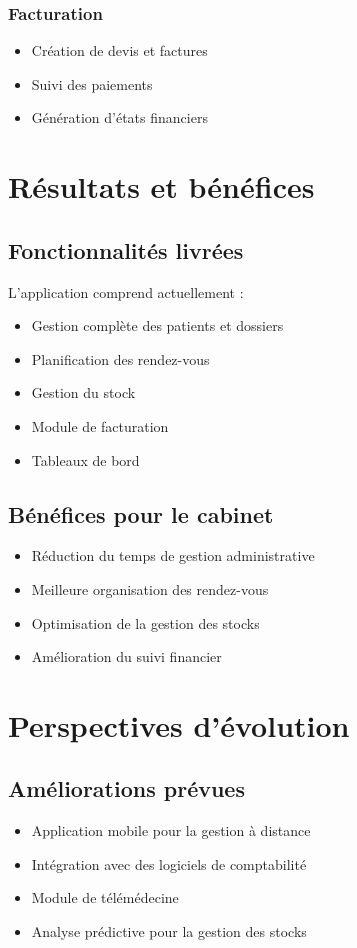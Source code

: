\documentclass[12pt,a4paper]{report}
\begin{document}
\subsection{Facturation}
\begin{itemize}
    \item Création de devis et factures
    \item Suivi des paiements
    \item Génération d'états financiers
\end{itemize}

\chapter{Résultats et bénéfices}
\section{Fonctionnalités livrées}
L'application comprend actuellement :
\begin{itemize}
    \item Gestion complète des patients et dossiers
    \item Planification des rendez-vous
    \item Gestion du stock
    \item Module de facturation
    \item Tableaux de bord
\end{itemize}

\section{Bénéfices pour le cabinet}
\begin{itemize}
    \item Réduction du temps de gestion administrative
    \item Meilleure organisation des rendez-vous
    \item Optimisation de la gestion des stocks
    \item Amélioration du suivi financier
\end{itemize}

\chapter{Perspectives d'évolution}
\section{Améliorations prévues}
\begin{itemize}
    \item Application mobile pour la gestion à distance
    \item Intégration avec des logiciels de comptabilité
    \item Module de télémédecine
    \item Analyse prédictive pour la gestion des stocks
\end{itemize}
\end{document}
